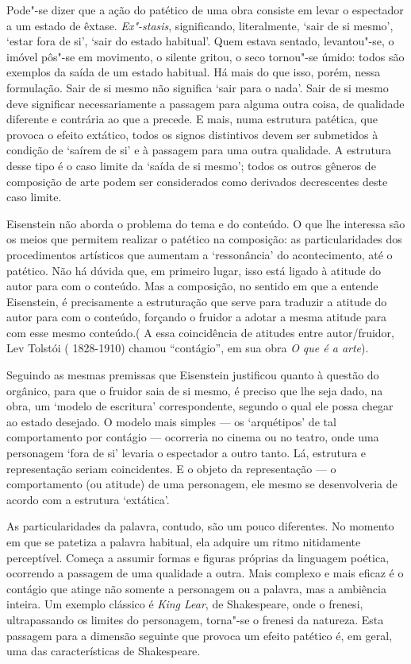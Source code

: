 Pode"-se dizer que a ação do patético de uma obra consiste em levar o
espectador a um estado de êxtase. \emph{Ex"-stasis}, significando,
literalmente, `sair de si mesmo', `estar fora de si', `sair do estado
habitual'. Quem estava sentado, levantou"-se, o imóvel pôs"-se em
movimento, o silente gritou, o seco tornou"-se úmido: todos são exemplos
da saída de um estado habitual. Há mais do que isso, porém, nessa
formulação. Sair de si mesmo não significa `sair para o nada'. Sair de
si mesmo deve significar necessariamente a passagem para alguma outra
coisa, de qualidade diferente e contrária ao que a precede. E mais, numa
estrutura patética, que provoca o efeito extático, todos os signos
distintivos devem ser submetidos à condição de `saírem de si' e à
passagem para uma outra qualidade. A estrutura desse tipo é o caso
limite da `saída de si mesmo'; todos os outros gêneros de composição de
arte podem ser considerados como derivados decrescentes deste caso
limite.

Eisenstein não aborda o problema do tema e do conteúdo. O que lhe
interessa são os meios que permitem realizar o patético na composição:
as particularidades dos procedimentos artísticos que aumentam a
`ressonância' do acontecimento, até o patético. Não há dúvida que, em
primeiro lugar, isso está ligado à atitude do autor para com o conteúdo.
Mas a composição, no sentido em que a entende Eisenstein, é precisamente
a estruturação que serve para traduzir a atitude do autor para com o
conteúdo, forçando o fruidor a adotar a mesma atitude para com esse
mesmo conteúdo.( A essa coincidência de atitudes entre autor/fruidor,
Lev Tolstói ( 1828-1910) chamou ``contágio'', em sua obra \emph{O que é
a arte}).

Seguindo as mesmas premissas que Eisenstein justificou quanto à questão
do orgânico, para que o fruidor saia de si mesmo, é preciso que lhe seja
dado, na obra, um `modelo de escritura' correspondente, segundo o qual
ele possa chegar ao estado desejado. O modelo mais simples --- os
`arquétipos' de tal comportamento por contágio --- ocorreria no cinema
ou no teatro, onde uma personagem `fora de si' levaria o espectador a
outro tanto. Lá, estrutura e representação seriam coincidentes. E o
objeto da representação --- o comportamento (ou atitude) de uma
personagem, ele mesmo se desenvolveria de acordo com a estrutura
`extática'.

As particularidades da palavra, contudo, são um pouco diferentes. No
momento em que se patetiza a palavra habitual, ela adquire um ritmo
nitidamente perceptível. Começa a assumir formas e figuras próprias da
linguagem poética, ocorrendo a passagem de uma qualidade a outra. Mais
complexo e mais eficaz é o contágio que atinge não somente a personagem
ou a palavra, mas a ambiência inteira. Um exemplo clássico é \emph{King
Lear}, de Shakespeare, onde o frenesi, ultrapassando os limites do
personagem, torna"-se o frenesi da natureza. Esta passagem para a
dimensão seguinte que provoca um efeito patético é, em geral, uma das
características de Shakespeare.

